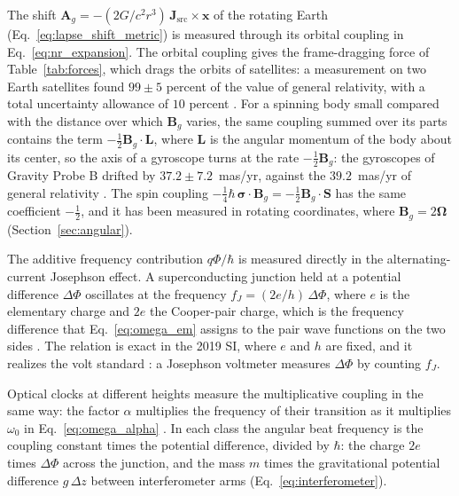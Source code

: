 \documentclass[aps,prd,onecolumn,tightenlines,nofootinbib,notitlepage,11pt,floatfix]{revtex4-2}
\theoremstyle{indentedtheorem}
\begin{document}
The shift $\mathbf{A}_g=-(2G/c^2r^3)\,\mathbf{J}_\text{src}\times\mathbf{x}$ of the rotating Earth (Eq.~\eqref{eq:lapse_shift_metric}) is measured through its orbital coupling in Eq.~\eqref{eq:nr_expansion}. The orbital coupling gives the frame-dragging force of Table~\ref{tab:forces}, which drags the orbits of satellites: a measurement on two Earth satellites found $99\pm5$ percent of the value of general relativity, with a total uncertainty allowance of $10$ percent \citep{Ciufolini2004Confirmation}. For a spinning body small compared with the distance over which $\mathbf{B}_g$ varies, the same coupling summed over its parts contains the term $-\tfrac{1}{2}\mathbf{B}_g\cdot\mathbf{L}$, where $\mathbf{L}$ is the angular momentum of the body about its center, so the axis of a gyroscope turns at the rate $-\tfrac{1}{2}\mathbf{B}_g$: the gyroscopes of Gravity Probe B drifted by $37.2\pm7.2$~mas/yr, against the $39.2$~mas/yr of general relativity \citep{Everitt2011Gravity}. The spin coupling $-\tfrac{1}{4}\hbar\,\boldsymbol{\sigma}\cdot\mathbf{B}_g=-\tfrac{1}{2}\mathbf{B}_g\cdot\mathbf{S}$ has the same coefficient $-\tfrac{1}{2}$, and it has been measured in rotating coordinates, where $\mathbf{B}_g=2\boldsymbol{\Omega}$ (Section~\ref{sec:angular}).

The additive frequency contribution $q\Phi/\hbar$ is measured directly in the alternating-current Josephson effect. A superconducting junction held at a potential difference $\Delta\Phi$ oscillates at the frequency $f_J=(2e/h)\,\Delta\Phi$, where $e$ is the elementary charge and $2e$ the Cooper-pair charge, which is the frequency difference that Eq.~\eqref{eq:omega_em} assigns to the pair wave functions on the two sides \citep{Josephson1962Possible,Shapiro1963Josephson}. The relation is exact in the 2019 SI, where $e$ and $h$ are fixed, and it realizes the volt standard \citep{BIPM2019Ampere,CODATA2022Constants}: a Josephson voltmeter measures $\Delta\Phi$ by counting $f_J$.

Optical clocks at different heights measure the multiplicative coupling in the same way: the factor $\alpha$ multiplies the frequency of their transition as it multiplies $\omega_0$ in Eq.~\eqref{eq:omega_alpha} \citep{Chou2010Optical,Bothwell2022Resolving}. In each class the angular beat frequency is the coupling constant times the potential difference, divided by $\hbar$: the charge $2e$ times $\Delta\Phi$ across the junction, and the mass $m$ times the gravitational potential difference $g\,\Delta z$ between interferometer arms (Eq.~\eqref{eq:interferometer}).
\end{document}
